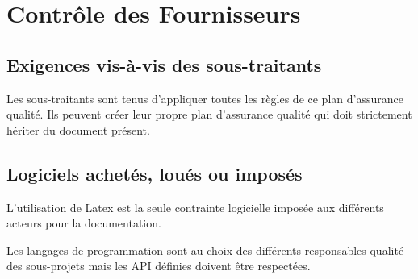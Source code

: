 \section{Contrôle des Fournisseurs}

\subsection{Exigences vis-à-vis des sous-traitants}
Les sous-traitants sont tenus d'appliquer toutes les règles de ce plan 
d'assurance qualité.
Ils peuvent créer leur propre plan d'assurance qualité qui doit strictement 
hériter du document présent.

\subsection{Logiciels achetés, loués ou imposés}
L'utilisation de Latex est la seule contrainte logicielle imposée aux 
différents acteurs pour la documentation.

Les langages de programmation sont au choix des différents responsables qualité
des sous-projets mais les API définies doivent être respectées.

